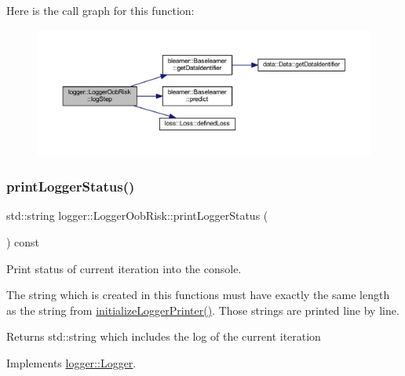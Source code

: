 Here is the call graph for this function\+:
\nopagebreak
\begin{figure}[H]
\begin{center}
\leavevmode
\includegraphics[width=350pt]{classlogger_1_1_logger_oob_risk_a4b0ea670a7970bca31037efab99cc06a_cgraph}
\end{center}
\end{figure}
\mbox{\label{classlogger_1_1_logger_oob_risk_a446e3e0c3766c8cda1add83c09d2e968}} 
\subsubsection{\texorpdfstring{print\+Logger\+Status()}{printLoggerStatus()}}
{\footnotesize\ttfamily std\+::string logger\+::\+Logger\+Oob\+Risk\+::print\+Logger\+Status (\begin{DoxyParamCaption}{ }\end{DoxyParamCaption}) const\hspace{0.3cm}{\ttfamily [virtual]}}



Print status of current iteration into the console. 

The string which is created in this functions must have exactly the same length as the string from {\ttfamily \mbox{\hyperlink{classlogger_1_1_logger_oob_risk_ac8b1b8a148878c38b1206fb00e0263f4}{initialize\+Logger\+Printer()}}}. Those strings are printed line by line.

\begin{DoxyReturn}{Returns}
{\ttfamily std\+::string} which includes the log of the current iteration 
\end{DoxyReturn}


Implements \mbox{\hyperlink{classlogger_1_1_logger_abad818a7e8053ca84cb267e883b5e377}{logger\+::\+Logger}}.

